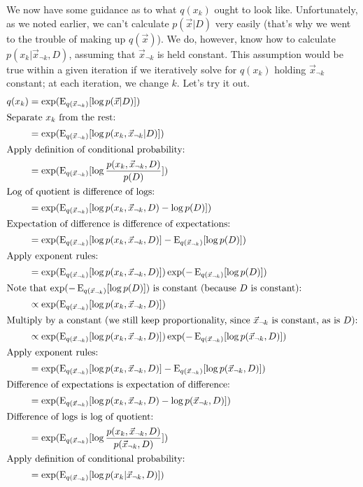 \documentclass[12pt]{article}
\newcommand{\E}{\operatorname{E}}
\begin{document}
We now have some guidance as to what $q(x_k)$ ought to look like.
Unfortunately, as we noted earlier, we can't calculate $p(\vec{x}|D)$ very
easily (that's why we went to the trouble of making up $q(\vec{x})$).  We do,
however, know how to calculate $p(x_k|\vec{x}_{\neg k}, D)$, assuming that
$\vec{x}_{\neg k}$ is held constant.  This assumption would be true within a
given iteration if we iteratively solve for $q(x_k)$ holding $\vec{x}_{\neg k}$
constant; at each iteration, we change $k$.  Let's try it out.
\begin{align}
    q(x_k) &=
    \exp (\E_{q(\vec{x}_{\neg k})}[\log p(\vec{x}|D)])
    \nonumber \\
    \intertext{Separate $x_{k}$ from the rest:}
    &=
    \exp (\E_{q(\vec{x}_{\neg k})}[\log p(x_k, \vec{x}_{\neg k}|D)])
    \nonumber \\
    \intertext{Apply definition of conditional probability:}
    &=
    \exp (\E_{q(\vec{x}_{\neg k})}[\log \frac{p(x_k, \vec{x}_{\neg k},D)}{p(D)}])
    \nonumber \\
    \intertext{Log of quotient is difference of logs:}
    &=
    \exp (\E_{q(\vec{x}_{\neg k})}[\log p(x_k, \vec{x}_{\neg k},D) - \log p(D)])
    \nonumber \\
    \intertext{Expectation of difference is difference of expectations:}
    &=
    \exp (\E_{q(\vec{x}_{\neg k})}[\log p(x_k, \vec{x}_{\neg k},D)] - \E_{q(\vec{x}_{\neg k})}[\log p(D)])
    \nonumber \\
    \intertext{Apply exponent rules:}
    &=
    \exp (\E_{q(\vec{x}_{\neg k})}[\log p(x_k, \vec{x}_{\neg k},D)]) \exp(- \E_{q(\vec{x}_{\neg k})}[\log p(D)])
    \nonumber \\
    \intertext{Note that $\exp(- \E_{q(\vec{x}_{\neg k})}[\log p(D)])$ is
    constant (because $D$ is constant):}
    &\propto
    \exp (\E_{q(\vec{x}_{\neg k})}[\log p(x_k, \vec{x}_{\neg k},D)])
    \label{eq:qformjoint}\\
    \intertext{Multiply by a constant (we still keep proportionality, since
    $\vec{x}_{\neg k}$ is constant, as is $D$):}
    &\propto
    \exp (\E_{q(\vec{x}_{\neg k})}[\log p(x_k, \vec{x}_{\neg k},D)])
    \exp (-\E_{q(\vec{x}_{\neg k})}[\log p(\vec{x}_{\neg k},D)])
    \nonumber \\
    \intertext{Apply exponent rules:}
    &=
    \exp (\E_{q(\vec{x}_{\neg k})}[\log p(x_k, \vec{x}_{\neg k},D)]
    -\E_{q(\vec{x}_{\neg k})}[\log p(\vec{x}_{\neg k},D)])
    \nonumber \\
    \intertext{Difference of expectations is expectation of difference:}
    &=
    \exp (\E_{q(\vec{x}_{\neg k})}[\log p(x_k, \vec{x}_{\neg k},D)
    -\log p(\vec{x}_{\neg k},D)])
    \nonumber \\
    \intertext{Difference of logs is log of quotient:}
    &=
    \exp (\E_{q(\vec{x}_{\neg k})}[\log \frac{p(x_k, \vec{x}_{\neg k},D)}
    {p(\vec{x}_{\neg k},D)}])
    \nonumber \\
    \intertext{Apply definition of conditional probability:}
    &=
    \exp (\E_{q(\vec{x}_{\neg k})}[\log p(x_k|\vec{x}_{\neg k},D)])
    \label{eq:qformcond}
\end{align}
\end{document}
